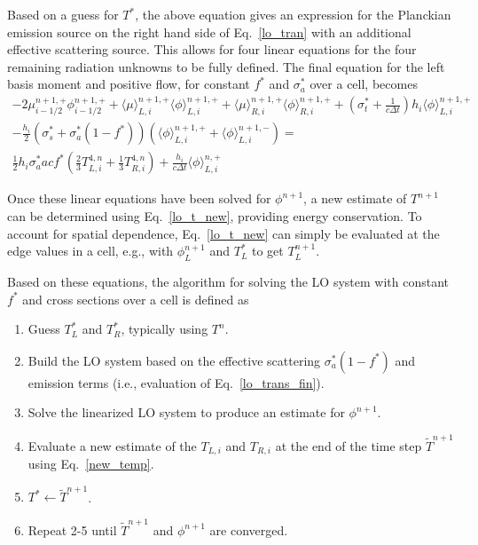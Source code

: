 \documentclass{mc2013}
\newcommand{\B}[1]{\ensuremath{\mathbf{#1}}}
\newcommand{\mom}[1]{\langle #1 \rangle}
\begin{document}
Based on a guess for $T^*$, the above equation gives an expression for
the Planckian emission source on the right hand side
of Eq.~\eqref{lo_tran} with an additional effective scattering source.
This allows for four linear equations for the four remaining radiation unknowns to be fully
defined.  The final equation for the left basis moment and positive flow, for constant
$f^*$ and $\sigma_a^*$ over a cell, becomes
\begin{multline}\label{lo_trans_fin}
    -2{\mu}_{i-1/2}^{n+1,+} \phi_{i-1/2}^{n+1,+} + \mom {\mu}_{L,i}^{n+1,+}
  \mom{\phi}_{L,i}^{n+1,+}
  +  \mom\mu_{R,i}^{n+1,+}
  \mom{\phi}_{R,i}^{n+1,+} +  \left(\sigma_t^*+\frac{1}{c \Delta t} \right) h_i 
  \mom{\phi}_{L,i}^{n+1,+} \\- \frac{h_i}{2}\left(\sigma_s^* + \sigma_a^*(1-f^*)\right)
  \left( \mom{\phi}_{L,i}^{n+1,+} +
  \mom\phi_{L,i}^{n+1,-}\right) = \\ \frac{1}{2} h_i \sigma_a^*a c f^* \left(\frac{2}{3} T_{L,i}^{4,n} +
  \frac{1}{3} T_{R,i}^{4,n} \right) + 
  \frac{h_i}{c\Delta t}\mom{\phi}_{L,i}^{n,+}
\end{multline}

Once these linear equations have been solved for $\phi^{n+1}$, a new estimate of
$T^{n+1}$ can be determined using Eq.~\eqref{lo_t_new}, providing energy
conservation.  To account for spatial dependence, Eq.~\eqref{lo_t_new} can simply be evaluated
at the edge values in a cell, e.g., with $\phi^{n+1}_L$ and $T^*_L$ to get $T_L^{n+1}$.

Based on these equations, the algorithm for solving the LO system with constant $f^*$
and cross sections over a cell is defined as
\begin{enumerate}
    \item Guess $T^*_L$ and $T^*_R$, typically using $T^n$.
    \item  Build the LO system based on the effective scattering $\sigma_a^*(1-f^*)$ and emission terms
        (i.e., evaluation of  Eq.~\eqref{lo_trans_fin}).
    \item Solve the linearized LO system to produce an estimate for $\phi^{n+1}$.
    \item Evaluate a new estimate of the $T_{L,i}$ and $T_{R,i}$ at the end of the time step
    $\tilde{T}^{n+1}$ using Eq.~\eqref{new_temp}.
    \item $T^*\leftarrow\tilde{T}^{n+1}$.
    \item Repeat 2-5 until $\tilde T^{n+1}$ and $\phi^{n+1}$ are converged.
\end{enumerate}
\end{document}
